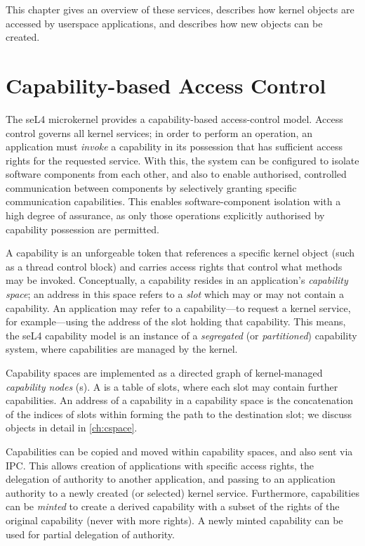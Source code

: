 This chapter gives an overview of these services, describes how kernel
objects are accessed by userspace applications, and describes how new
objects can be created.

\section{Capability-based Access Control}
\label{sec:cap-access-control}

The seL4 microkernel provides a capability-based access-control model.
Access control governs all kernel services; in order to perform an
operation, an application must \emph{invoke} a capability in its
possession that has sufficient access rights for the requested service.
With this, the system can be configured to isolate software components from
each other, and also to enable authorised, controlled communication
between components by selectively granting specific communication
capabilities.  This enables software-component isolation with a high
degree of assurance, as only those operations explicitly authorised by
capability possession are permitted.

A capability is an unforgeable token that references a specific kernel
object (such as a thread control block) and carries access rights that
control what methods may be invoked.
Conceptually, a capability resides in an application's \emph{capability
space}; an address in this space refers to a \emph{slot} which may or
may not contain a capability.  An application may refer to
a capability---to request a kernel service, for example---using the
address of the slot holding that capability.  This means, the seL4
capability model is an instance of a \emph{segregated} (or \emph{partitioned})
capability system, where capabilities are managed by the kernel.

Capability spaces are implemented as a directed graph of kernel-managed
\emph{capability nodes} (s).  A  is a table of
slots, where each slot may contain further  capabilities. An
address of a capability in a capability space is the concatenation of the indices
of slots within  forming the path to the destination
slot; we discuss  objects in detail in \autoref{ch:cspace}.

Capabilities can be copied and moved within capability spaces, and
also sent via IPC. This allows creation of applications with specific
access rights, the delegation of authority to another application, and
passing to an application authority to a newly created (or selected)
kernel service. Furthermore, capabilities can be \emph{minted} to
create a derived capability with a subset of the rights of the
original capability (never with more rights). A newly minted
capability can be used for partial delegation of authority.

